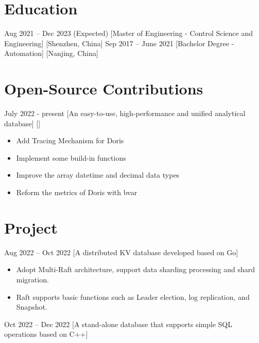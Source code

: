 \documentclass{chicv}
\begin{document}
\begin{basicinfo}
\end{basicinfo}

\section{Education}
  {Aug 2021 -- Dec 2023 (Expected)}
  [Master of Engineering - Control Science and Engineering]
  [Shenzhen, China]
  {Sep 2017 -- June 2021}
  [Bachelor Degree - Automation]
  [Nanjing, China]

\section{Open-Source Contributions}

  {July 2022 - present}
  [An easy-to-use, high-performance and unified analytical database]
  []
  \begin{itemize}
    \item  Add Tracing Mechanism for Doris
    \item  Implement some build-in functions
    \item  Improve the array datetime and decimal data types
    \item  Reform the metrics of Doris with bvar
  \end{itemize}

\section{Project}

{Aug 2022 – Oct 2022}
[A distributed KV database developed based on Go]

\begin{itemize}
	\item Adopt Multi-Raft architecture, support data sharding processing and shard migration.
	\item Raft supports basic functions such as Leader election, log replication, and Snapshot.
\end{itemize}

{Oct 2022 – Dec 2022}
[A stand-alone database that supports simple SQL operations based on C++]
\end{document}

